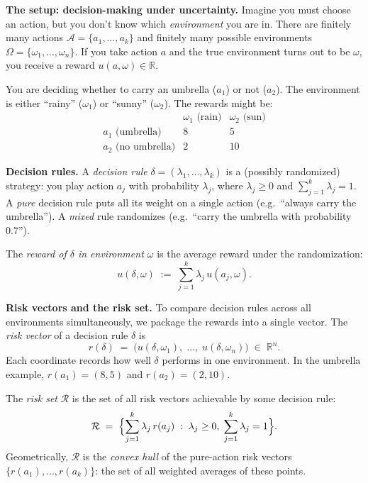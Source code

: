\documentclass[11pt]{article}
\begin{document}
\begin{exercise}
\label{ex:complete-class}
\noindent
\textbf{The setup: decision-making under uncertainty.} Imagine you must choose an
action, but you don't know which \emph{environment} you are in. There are finitely
many actions $\mathcal{A} = \{a_1, \ldots, a_k\}$ and finitely many possible
environments $\Omega = \{\omega_1, \ldots, \omega_n\}$. If you take action $a$ and the
true environment turns out to be $\omega$, you receive a reward
$u(a, \omega) \in \mathbb{R}$.

\begin{example}
You are deciding whether to carry an umbrella ($a_1$) or not
($a_2$). The environment is either ``rainy'' ($\omega_1$) or ``sunny'' ($\omega_2$).
The rewards might be:
\[
\begin{array}{c|cc}
 & \omega_1 \text{ (rain)} & \omega_2 \text{ (sun)} \\
\hline
a_1 \text{ (umbrella)} & 8 & 5 \\
a_2 \text{ (no umbrella)} & 2 & 10
\end{array}
\]
\end{example}

\medskip
\noindent
\textbf{Decision rules.} A \emph{decision rule}
$\delta = (\lambda_1, \ldots, \lambda_k)$ is a (possibly randomized) strategy: you
play action $a_j$ with probability $\lambda_j$, where $\lambda_j \geq 0$ and
$\sum_{j=1}^k \lambda_j = 1$. A \emph{pure} decision rule puts all its weight on a
single action (e.g.\ ``always carry the umbrella''). A \emph{mixed} rule randomizes
(e.g.\ ``carry the umbrella with probability $0.7$'').

\medskip
\noindent
The \emph{reward of $\delta$ in environment $\omega$} is the average reward under
the randomization:
\[
  u(\delta, \omega) \;:=\; \sum_{j=1}^k \lambda_j\, u(a_j, \omega).
\]

\medskip
\noindent
\textbf{Risk vectors and the risk set.} To compare decision rules across all
environments simultaneously, we package the rewards into a single vector. The
\emph{risk vector} of a decision rule $\delta$ is
\[
  r(\delta) \;=\; \bigl(u(\delta, \omega_1),\; \ldots,\; u(\delta, \omega_n)\bigr)
  \;\in\; \mathbb{R}^n.
\]
Each coordinate records how well $\delta$ performs in one environment. In the umbrella
example, $r(a_1) = (8, 5)$ and $r(a_2) = (2, 10)$.

\medskip
\noindent
The \emph{risk set} $\mathcal{R}$ is the set of all risk vectors achievable by some
decision rule:
\[
  \mathcal{R} \;=\; \Bigl\{\sum_{j=1}^k \lambda_j\, r(a_j) \;:\;
  \lambda_j \geq 0,\; \sum_{j=1}^k \lambda_j = 1\Bigr\}.
\]
Geometrically, $\mathcal{R}$ is the \emph{convex hull} of the pure-action risk
vectors $\{r(a_1), \ldots, r(a_k)\}$: the set of all weighted averages of these
points.


\end{exercise}
\end{document}
